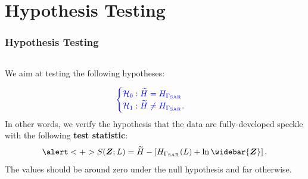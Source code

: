 \documentclass[aspectratio=169,10pt]{beamer}
\begin{document}
\section{Hypothesis Testing}
\begin{frame} \frametitle{\large{Hypothesis Testing }}\vspace{0.1cm}

 \justifying
\begin{columns}[T,onlytextwidth]
    \begin{column}{.45\textwidth}
			\begin{block}{}\justifying
 We aim at testing the following hypotheses:

\[\textcolor[rgb]{0,0,1}{
 \begin{cases}\mathcal{H}_0: \widetilde{H}= H_{\Gamma_{\text{SAR}}}\\ 
  \mathcal{H}_1:\widetilde{H}\neq H_{\Gamma_{\text{SAR}}}.\end{cases}}
\] In other words, we verify the hypothesis that the data are
fully-developed speckle with the following \textbf{test statistic}:
\pause
\begin{equation*}
\alert<+>{S(\bm{Z};L)= \widetilde{H}-\left[H_{\Gamma_{\text{SAR}}}(L)+\ln \widebar{\bm{Z}}\right].}
\end{equation*} The values should be around zero under the null
hypothesis and far otherwise.
		\end{block}
    \end{column}
		

\end{columns}
\end{frame}
\end{document}
